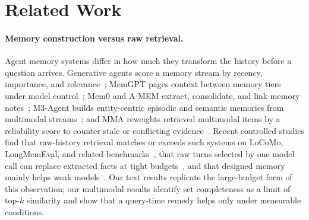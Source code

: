 \section{Related Work}
\label{sec:related}

\paragraph{Memory construction versus raw retrieval.} Agent memory systems differ in how much they transform the history before a question arrives. Generative agents score a memory stream by recency, importance, and relevance~\citep{park2023generative}; MemGPT pages context between memory tiers under model control~\citep{packer2023memgpt}; Mem0 and A-MEM extract, consolidate, and link memory notes~\citep{chhikara2025mem0,xu2025amem}; M3-Agent builds entity-centric episodic and semantic memories from multimodal streams~\citep{long2025m3agent}; and MMA reweights retrieved multimodal items by a reliability score to counter stale or conflicting evidence~\citep{lu2026mma}. Recent controlled studies find that raw-history retrieval matches or exceeds such systems on LoCoMo, LongMemEval, and related benchmarks~\citep{bao2026rawrag,zhou2026explicit}, that raw turns selected by one model call can replace extracted facts at tight budgets~\citep{sharma2026selection}, and that designed memory mainly helps weak models~\citep{peng2026memorytax}. Our text results replicate the large-budget form of this observation; our multimodal results identify set completeness as a limit of top-$k$ similarity and show that a query-time remedy helps only under measurable conditions.

